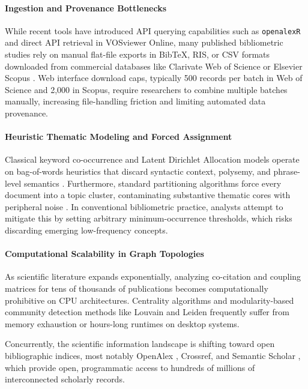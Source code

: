 \documentclass[preprint,12pt]{elsarticle}
\begin{document}
\paragraph{Ingestion and Provenance Bottlenecks} While recent tools have introduced API querying capabilities such as \texttt{openalexR} and direct API retrieval in VOSviewer Online, many published bibliometric studies rely on manual flat-file exports in BibTeX, RIS, or CSV formats downloaded from commercial databases like Clarivate Web of Science or Elsevier Scopus \cite{moral2020software}. Web interface download caps, typically 500 records per batch in Web of Science and 2,000 in Scopus, require researchers to combine multiple batches manually, increasing file-handling friction and limiting automated data provenance.

\paragraph{Heuristic Thematic Modeling and Forced Assignment} Classical keyword co-occurrence and Latent Dirichlet Allocation models operate on bag-of-words heuristics that discard syntactic context, polysemy, and phrase-level semantics \cite{blei2003latent}. Furthermore, standard partitioning algorithms force every document into a topic cluster, contaminating substantive thematic cores with peripheral noise \cite{campello2013density, grootendorst2022bertopic}. In conventional bibliometric practice, analysts attempt to mitigate this by setting arbitrary minimum-occurrence thresholds, which risks discarding emerging low-frequency concepts.

\paragraph{Computational Scalability in Graph Topologies} As scientific literature expands exponentially, analyzing co-citation and coupling matrices for tens of thousands of publications becomes computationally prohibitive on CPU architectures. Centrality algorithms and modularity-based community detection methods like Louvain and Leiden frequently suffer from memory exhaustion or hours-long runtimes on desktop systems.

Concurrently, the scientific information landscape is shifting toward open bibliographic indices, most notably OpenAlex \cite{priem2022openalex}, Crossref, and Semantic Scholar \cite{kinney2023semantic}, which provide open, programmatic access to hundreds of millions of interconnected scholarly records.
\end{document}

